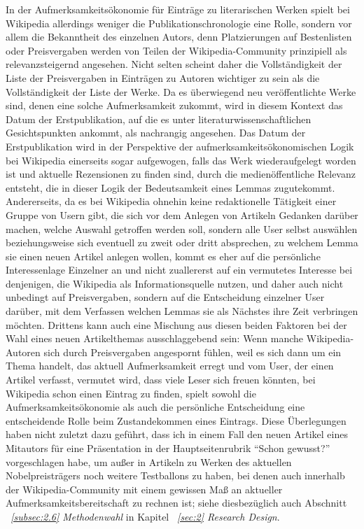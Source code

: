 \documentclass[fontsize=12pt]{scrartcl}
\begin{document}
In der Aufmerksamkeits\"okonomie f\"ur Eintr\"age zu li\-te\-ra\-rischen Werken spielt bei Wi\-ki\-pe\-dia al\-ler\-dings weniger die Publikationschronologie eine Rolle, sondern vor allem die Bekanntheit des einzelnen Autors\textsuperscript{\tiny *}, denn Platzierungen auf Bestenlisten oder Preisvergaben werden von Teilen der Wi\-ki\-pe\-dia-Community prinzipiell als re\-le\-vanz\-stei\-gernd angesehen. Nicht selten scheint daher die Vollst\"andigkeit der Liste der Preisvergaben in Eintr\"agen zu Autoren\textsuperscript{\tiny *} wichtiger zu sein als die Vollst\"andigkeit der Liste der Werke. Da es \"uberwiegend neu ver\"of\-fent\-lichte Werke sind, denen eine solche Aufmerksamkeit zukommt, wird in diesem Kontext das Datum der Erstpublikation, auf die es unter li\-te\-ra\-tur\-wissenschaftlichen Gesichtspunkten ankommt, als nachrangig angesehen. Das Datum der Erstpublikation wird in der Perspektive der aufmerksamkeits\"okonomischen Logik bei Wi\-ki\-pe\-dia einerseits sogar aufgewogen, falls das Werk wiederaufgelegt worden ist und aktuelle Rezensionen zu finden sind, durch die medien\"of\-fent\-liche Relevanz entsteht, die in dieser Logik der Bedeutsamkeit eines Lemmas zugutekommt. An\-de\-rerseits, da es bei Wi\-ki\-pe\-dia ohnehin keine redaktionelle T\"atigkeit einer Gruppe von Usern gibt, die sich vor dem Anlegen von Artikeln Gedanken dar\"uber machen, welche Auswahl getroffen werden soll, sondern alle \mbox{User} \mbox{selbst} ausw\"ahlen beziehungsweise sich eventuell zu zweit oder dritt absprechen, zu welchem Lemma sie einen neuen Artikel anlegen wollen, kommt es eher auf die pers\"onliche Interessenlage Einzelner an und nicht zuallererst auf ein vermutetes Interesse bei denjenigen, die Wi\-ki\-pe\-dia als Informationsquelle nutzen, und daher auch nicht un\-be\-dingt auf Preisvergaben, sondern auf die Entscheidung einzelner \mbox{User} dar\"uber, mit dem Verfassen welchen Lemmas sie als N\"achstes ihre Zeit verbringen m\"ochten. Drittens kann auch eine Mischung aus diesen beiden Faktoren bei der Wahl eines neuen Artikelthemas ausschlaggebend sein: Wenn manche Wi\-ki\-pe\-dia-Autoren\textsuperscript{\tiny *} sich durch Preisvergaben angespornt f\"uhlen, weil es sich dann um ein Thema handelt, das aktuell Aufmerksamkeit erregt und vom User, der einen Artikel verfasst, vermutet wird, dass viele Leser\textsuperscript{\tiny *} sich freuen k\"onnten, bei Wi\-ki\-pe\-dia schon einen Eintrag zu finden, spielt sowohl die Aufmerksamkeits\"okonomie als auch die pers\"onliche Entscheidung eine entscheidende Rolle beim Zustandekommen eines Eintrags. Diese \"Uberlegungen haben nicht zu\-letzt dazu gef\"uhrt, dass ich in einem Fall den neuen Artikel eines Mitautors\textsuperscript{\tiny *} f\"ur eine Pr\"asentation in der Hauptsei\-tenrubrik "`Schon gewusst?"' vorgeschlagen habe, um au{\ss}er in Artikeln zu Werken des aktuellen Nobelpreistr\"agers\textsuperscript{\tiny *} noch weitere Testballons zu haben, bei denen auch innerhalb der Wi\-ki\-pe\-dia-Community mit einem gewissen Ma{\ss} an aktueller Aufmerksamkeitsbe\-reit\-schaft zu rechnen ist; siehe diesbez\"uglich auch Abschnitt \textit{~\ref{subsec:2.6} Methodenwahl} in Kapitel \textit{~\ref{sec:2} Research Design}.
\end{document}
